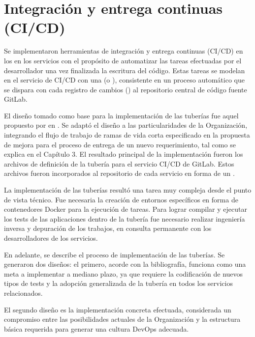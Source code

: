 \section{Integración y entrega continuas (CI/CD)}
%
Se implementaron herramientas de integración y entrega continuas
(CI/CD) en los en los servicios con el propósito de automatizar las
tareas efectuadas por el desarrollador una vez finalizada la escritura
del código. Estas tareas se modelan en el servicio de CI/CD con una
 (o ), consistente en un proceso
automático que se dispara con cada registro de cambios ()
al repositorio central de código fuente GitLab.

El diseño tomado como base para la implementación de las tuberías fue
aquel propuesto por \citeauthor{humblefarley} en
\cite{humblefarley}. Se adaptó el diseño a las particularidades de la
Organización, integrando el flujo de trabajo de ramas de vida corta
especificado en la propuesta de mejora para el proceso de entrega de
un nuevo requerimiento, tal como se explica en el Capítulo 3. El
resultado principal de la implementación fueron los archivos de
definición de la tubería para el servicio CI/CD de GitLab. Estos
archivos fueron incorporados al repositorio de cada servicio en forma
de un .

La implementación de las tuberías resultó una tarea muy compleja desde
el punto de vista técnico. Fue necesaria la creación de entornos
específicos en forma de contenedores Docker para la ejecución de
tareas. Para lograr compilar y ejecutar los tests de las aplicaciones
dentro de la tubería fue necesario realizar ingeniería inversa y
depuración de los trabajos, en consulta permanente con los
desarrolladores de los servicios.

En adelante, se describe el proceso de implementación de las
tuberías. Se generaron dos diseños: el primero, acorde con la
bibliografía, funciona como una meta a implementar a mediano plazo, ya
que requiere la codificación de nuevos tipos de tests y la adopción
generalizada de la tubería en todos los servicios relacionados.

El segundo diseño es la implementación concreta efectuada, considerada
un compromiso entre las posibilidades actuales de la Organización y la
estructura básica requerida para generar una cultura DevOps adecuada.
%
